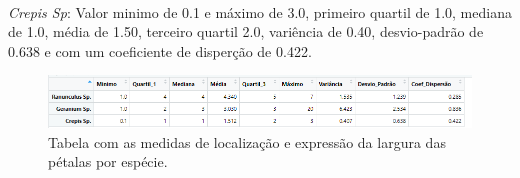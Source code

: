 \documentclass{article}
\begin{document}
\paragraph{} \textit{Crepis Sp}: Valor minimo de 0.1 e máximo de 3.0, primeiro quartil de 1.0, mediana de 1.0, média de 1.50,  terceiro quartil 2.0, variência de 0.40, desvio-padrão de 0.638 e com um coeficiente de disperção de 0.422.

\begin{figure}[h]
       \centering %
        \includegraphics[scale=0.8]{tabela_largura_especie.png}
       \caption{Tabela com as medidas de localização e expressão da largura das pétalas por espécie.}
       \label{fig:logo}
    \end{figure}

\paragraph{}

\paragraph{}
\paragraph{}
\paragraph{}
\paragraph{}
\paragraph{}
\paragraph{}
\paragraph{}
\paragraph{}
\end{document}
